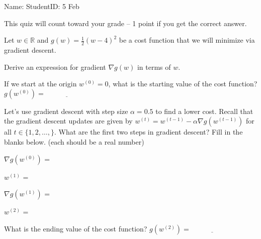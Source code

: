 \documentclass{article}
\begin{document}
\thispagestyle{empty}

Name: \underline{\hspace{2in}} StudentID: \underline{\hspace{2in}} 5 Feb

This quiz will count toward your grade -- 1 point if you get the
correct answer.

Let $w\in\mathbb R$ and $g(w) = \frac 1 2 (w-4)^2$ be a cost function
that we will minimize via gradient descent.

Derive an expression for gradient $\nabla g(w)$ in terms of $w$.

\vskip 1in 

If we start at the origin $w^{(0)}=0$, what is the starting value of the
cost function? $g(w^{(0)})=\underline{\hspace{1in}}$ 

Let's use gradient descent with step size $\alpha=0.5$ to find a lower
cost. Recall that the gradient descent updates are given by
$w^{(t)}=w^{(t-1)} - \alpha\nabla g(w^{(t-1)})$ for all
$t\in\{1, 2, \dots, \}$. What are the first two steps in gradient
descent? Fill in the blanks below. (each should be a real number)

$\nabla g(w^{(0)})$ = \underline{\hspace{1in}}

\vskip 1in

$ w^{(1)}$ = \underline{\hspace{1in}}

\vskip 1in

$\nabla g(w^{(1)})$ = \underline{\hspace{1in}}

\vskip 1in

$ w^{(2)}$ = \underline{\hspace{1in}}

\vskip 1in

What is the ending value of the cost function?
$g(w^{(2)})=\underline{\hspace{1in}}$
\end{document}
